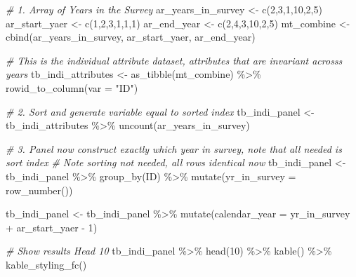\documentclass[
]{book}
\newenvironment{Shaded}{\begin{snugshade}}{\end{snugshade}}
\newcommand{\AttributeTok}[1]{\textcolor[rgb]{0.77,0.63,0.00}{#1}}
\newcommand{\CommentTok}[1]{\textcolor[rgb]{0.56,0.35,0.01}{\textit{#1}}}
\newcommand{\DecValTok}[1]{\textcolor[rgb]{0.00,0.00,0.81}{#1}}
\newcommand{\FunctionTok}[1]{\textcolor[rgb]{0.00,0.00,0.00}{#1}}
\newcommand{\NormalTok}[1]{#1}
\newcommand{\OtherTok}[1]{\textcolor[rgb]{0.56,0.35,0.01}{#1}}
\newcommand{\SpecialCharTok}[1]{\textcolor[rgb]{0.00,0.00,0.00}{#1}}
\newcommand{\StringTok}[1]{\textcolor[rgb]{0.31,0.60,0.02}{#1}}
\begin{document}
\begin{Shaded}
\begin{Highlighting}[]
\CommentTok{\# 1. Array of Years in the Survey}
\NormalTok{ar\_years\_in\_survey }\OtherTok{\textless{}{-}} \FunctionTok{c}\NormalTok{(}\DecValTok{2}\NormalTok{,}\DecValTok{3}\NormalTok{,}\DecValTok{1}\NormalTok{,}\DecValTok{10}\NormalTok{,}\DecValTok{2}\NormalTok{,}\DecValTok{5}\NormalTok{)}
\NormalTok{ar\_start\_yaer }\OtherTok{\textless{}{-}} \FunctionTok{c}\NormalTok{(}\DecValTok{1}\NormalTok{,}\DecValTok{2}\NormalTok{,}\DecValTok{3}\NormalTok{,}\DecValTok{1}\NormalTok{,}\DecValTok{1}\NormalTok{,}\DecValTok{1}\NormalTok{)}
\NormalTok{ar\_end\_year }\OtherTok{\textless{}{-}} \FunctionTok{c}\NormalTok{(}\DecValTok{2}\NormalTok{,}\DecValTok{4}\NormalTok{,}\DecValTok{3}\NormalTok{,}\DecValTok{10}\NormalTok{,}\DecValTok{2}\NormalTok{,}\DecValTok{5}\NormalTok{)}
\NormalTok{mt\_combine }\OtherTok{\textless{}{-}} \FunctionTok{cbind}\NormalTok{(ar\_years\_in\_survey, ar\_start\_yaer, ar\_end\_year)}

\CommentTok{\# This is the individual attribute dataset, attributes that are invariant acrosss years}
\NormalTok{tb\_indi\_attributes }\OtherTok{\textless{}{-}} \FunctionTok{as\_tibble}\NormalTok{(mt\_combine) }\SpecialCharTok{\%\textgreater{}\%} \FunctionTok{rowid\_to\_column}\NormalTok{(}\AttributeTok{var =} \StringTok{"ID"}\NormalTok{)}

\CommentTok{\# 2. Sort and generate variable equal to sorted index}
\NormalTok{tb\_indi\_panel }\OtherTok{\textless{}{-}}\NormalTok{ tb\_indi\_attributes }\SpecialCharTok{\%\textgreater{}\%} \FunctionTok{uncount}\NormalTok{(ar\_years\_in\_survey)}

\CommentTok{\# 3. Panel now construct exactly which year in survey, note that all needed is sort index}
\CommentTok{\# Note sorting not needed, all rows identical now}
\NormalTok{tb\_indi\_panel }\OtherTok{\textless{}{-}}\NormalTok{ tb\_indi\_panel }\SpecialCharTok{\%\textgreater{}\%}
                    \FunctionTok{group\_by}\NormalTok{(ID) }\SpecialCharTok{\%\textgreater{}\%}
                    \FunctionTok{mutate}\NormalTok{(}\AttributeTok{yr\_in\_survey =} \FunctionTok{row\_number}\NormalTok{())}

\NormalTok{tb\_indi\_panel }\OtherTok{\textless{}{-}}\NormalTok{ tb\_indi\_panel }\SpecialCharTok{\%\textgreater{}\%}
                    \FunctionTok{mutate}\NormalTok{(}\AttributeTok{calendar\_year =}\NormalTok{ yr\_in\_survey }\SpecialCharTok{+}\NormalTok{ ar\_start\_yaer }\SpecialCharTok{{-}} \DecValTok{1}\NormalTok{)}

\CommentTok{\# Show results Head 10}
\NormalTok{tb\_indi\_panel }\SpecialCharTok{\%\textgreater{}\%} \FunctionTok{head}\NormalTok{(}\DecValTok{10}\NormalTok{) }\SpecialCharTok{\%\textgreater{}\%}
  \FunctionTok{kable}\NormalTok{() }\SpecialCharTok{\%\textgreater{}\%}
  \FunctionTok{kable\_styling\_fc}\NormalTok{()}
\end{Highlighting}
\end{Shaded}
\end{document}
